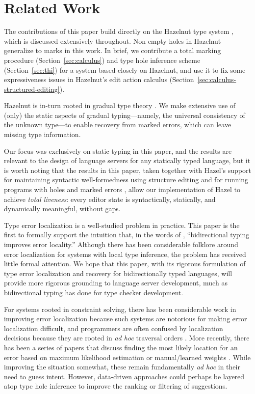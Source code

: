 \section{Related Work}
\label{sec:related}

The contributions of this paper build directly on the Hazelnut type system \cite{omar2017b}, which is discussed extensively throughout. Non-empty holes in Hazelnut generalize to marks in this work. In brief, we contribute a total marking procedure (Section~\ref{sec:calculus}) and type hole inference scheme (Section~\ref{sec:thi}) for a system based closely on Hazelnut, and use it to fix some expressiveness issues in Hazelnut's edit action calculus (Section~\ref{sec:calculus-structured-editing}). 

Hazelnut is in-turn rooted in gradual type theory \cite{siek2006, siek2015}. We make extensive use of (only) the static aspects of gradual typing---namely, the universal consistency of the unknown type---to enable recovery from marked errors, which can leave missing type information.

Our focus was exclusively on static typing in this paper, and the results are relevant to the design of language servers for any statically typed language, but it is worth noting that the results in this paper, taken together with Hazel's support for maintaining syntactic well-formedness using structure editing \cite{moon2023,moon2022} and for running programs with holes and marked errors \cite{omar2019}, allow our implementation of Hazel to achieve \emph{total liveness}: every editor state is syntactically, statically, and dynamically meaningful, without gaps.

Type error localization is a well-studied problem in practice. This paper is the first to formally support the intuition that, in the words of \citet{dunfield2019}, ``bidirectional typing improves error locality.'' Although there has been considerable folklore around error localization 
for systems with local type inference, the problem has received little formal attention. We hope that this paper, with its rigorous formulation
of type error localization and recovery for bidirectionally typed languages, will provide more rigorous grounding to language server development,
much as bidirectional typing has done for type checker development.

For systems rooted in constraint solving, there has been considerable work in improving error localization because such systems are notorious for making error localization difficult, and programmers are often confused by localization decisions \cite{wand1986} because they are rooted in \emph{ad hoc} traversal orders \cite{mcadam1999,lee1998}. 
More recently, there has been a series of papers that discuss finding the most likely location for an error based on maximum likelihood estimation \cite{zhang2014} or manual/learned weights \cite{pavlinovic2014,seidel2017}.
While improving the situation somewhat, these remain fundamentally \emph{ad hoc} in their need to guess intent. However, data-driven approaches could perhaps be layered atop type hole inference to improve the ranking or filtering of suggestions.

